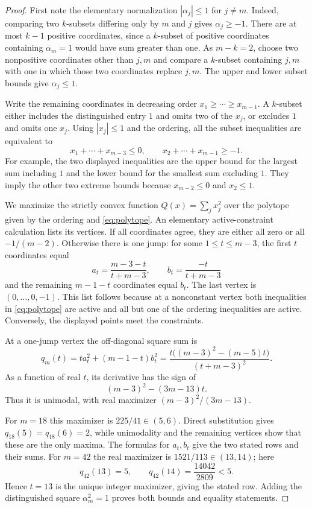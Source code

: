 \documentclass[10pt]{article}
\begin{document}
\begin{proof}
First note the elementary normalization $|\alpha_j|\le1$ for $j\ne m$.
Indeed, comparing two $k$-subsets differing only by $m$ and $j$ gives
$\alpha_j\ge-1$. There are at most $k-1$ positive coordinates, since a
$k$-subset of positive coordinates containing $\alpha_m=1$ would have sum
greater than one. As $m-k=2$, choose two nonpositive coordinates other than
$j,m$ and compare a $k$-subset containing $j,m$ with one in which those two
coordinates replace $j,m$. The upper and lower subset bounds give
$\alpha_j\le1$.

Write the remaining coordinates in decreasing order
$x_1\ge\cdots\ge x_{m-1}$. A $k$-subset either includes the distinguished
entry $1$ and omits two of the $x_j$, or excludes $1$ and omits one $x_j$.
Using $|x_j|\le1$ and the ordering, all the subset inequalities are equivalent
to
\begin{equation}\label{eq:polytope}
 x_1+\cdots+x_{m-3}\le0,
 \qquad x_2+\cdots+x_{m-1}\ge-1.
\end{equation}
For example, the two displayed inequalities are the upper bound for the
largest sum including $1$ and the lower bound for the smallest sum excluding
$1$. They imply the other two extreme bounds because $x_{m-2}\le0$ and
$x_2\le1$.

We maximize the strictly convex function $Q(x)=\sum_jx_j^2$ over the
polytope given by the ordering and \eqref{eq:polytope}. An elementary
active-constraint calculation lists its vertices. If all coordinates agree,
they are either all zero or all $-1/(m-2)$. Otherwise there is one jump: for
some $1\le t\le m-3$, the first $t$ coordinates equal
\[
 a_t=\frac{m-3-t}{t+m-3},
 \qquad
 b_t=\frac{-t}{t+m-3}
\]
and the remaining $m-1-t$ coordinates equal $b_t$. The last vertex is
$(0,\ldots,0,-1)$. This list follows because at a nonconstant vertex both
inequalities in \eqref{eq:polytope} are active and all but one of the ordering
inequalities are active. Conversely, the displayed points meet the constraints.

At a one-jump vertex the off-diagonal square sum is
\begin{equation}\label{eq:q}
 q_m(t)=t a_t^2+(m-1-t)b_t^2
 =\frac{t\bigl((m-3)^2-(m-5)t\bigr)}{(t+m-3)^2}.
\end{equation}
As a function of real $t$, its derivative has the sign of
\[
 (m-3)^2-(3m-13)t.
\]
Thus it is unimodal, with real maximizer $(m-3)^2/(3m-13)$.

For $m=18$ this maximizer is $225/41\in(5,6)$. Direct substitution gives
$q_{18}(5)=q_{18}(6)=2$, while unimodality and the remaining vertices show
that these are the only maxima. The formulas for $a_t,b_t$ give the two
stated rows and their sums. For $m=42$ the real maximizer is
$1521/113\in(13,14)$; here
\[
 q_{42}(13)=5,\qquad q_{42}(14)=\frac{14042}{2809}<5.
\]
Hence $t=13$ is the unique integer maximizer, giving the stated row. Adding
the distinguished square $\alpha_m^2=1$ proves both bounds and equality
statements.
\end{proof}
\end{document}
